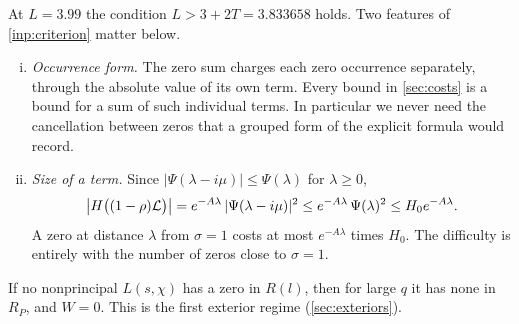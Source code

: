 At $L=3.99$ the condition $L>3+2T=3.833658$ holds. Two features of \cref{inp:criterion} matter
below.
\begin{enumerate}[(i)]
  \item \emph{Occurrence form.} The zero sum charges each zero occurrence separately, through the
    absolute value of its own term. Every bound in \cref{sec:costs} is a bound for a sum of such
    individual terms. In particular we never need the cancellation between zeros that a grouped
    form of the explicit formula would record.
  \item \emph{Size of a term.} Since $|\Psi(\lambda-i\mu)|\le\Psi(\lambda)$ for $\lambda\ge0$,
    \begin{equation}\label{eq:termbound}
      \bigl|H\bigl((1-\rho)\mathcal{L}\bigr)\bigr|=e^{-A\lambda}\,|\Psi(\lambda-i\mu)|^2\le
      e^{-A\lambda}\,\Psi(\lambda)^2\le H_0e^{-A\lambda}.
    \end{equation}
    A zero at distance $\lambda$ from $\sigma=1$ costs at most $e^{-A\lambda}$ times $H_0$. The
    difficulty is entirely with the number of zeros close to $\sigma=1$.
\end{enumerate}

If no nonprincipal $L(s,\chi)$ has a zero in $R(l)$, then for large $q$ it has none in $R_P$, and
$W=0$. This is the first exterior regime (\cref{sec:exteriors}).
